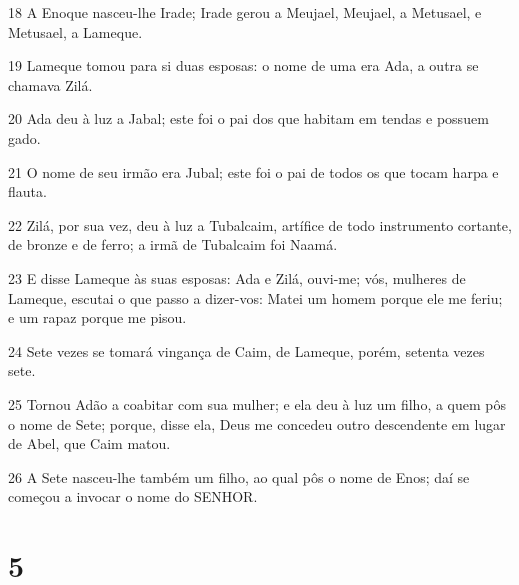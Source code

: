 \par 18 A Enoque nasceu-lhe Irade; Irade gerou a Meujael, Meujael, a Metusael, e Metusael, a Lameque.
\par 19 Lameque tomou para si duas esposas: o nome de uma era Ada, a outra se chamava Zilá.
\par 20 Ada deu à luz a Jabal; este foi o pai dos que habitam em tendas e possuem gado.
\par 21 O nome de seu irmão era Jubal; este foi o pai de todos os que tocam harpa e flauta.
\par 22 Zilá, por sua vez, deu à luz a Tubalcaim, artífice de todo instrumento cortante, de bronze e de ferro; a irmã de Tubalcaim foi Naamá.
\par 23 E disse Lameque às suas esposas: Ada e Zilá, ouvi-me; vós, mulheres de Lameque, escutai o que passo a dizer-vos: Matei um homem porque ele me feriu; e um rapaz porque me pisou.
\par 24 Sete vezes se tomará vingança de Caim, de Lameque, porém, setenta vezes sete.
\par 25 Tornou Adão a coabitar com sua mulher; e ela deu à luz um filho, a quem pôs o nome de Sete; porque, disse ela, Deus me concedeu outro descendente em lugar de Abel, que Caim matou.
\par 26 A Sete nasceu-lhe também um filho, ao qual pôs o nome de Enos; daí se começou a invocar o nome do SENHOR.

\chapter{5}

